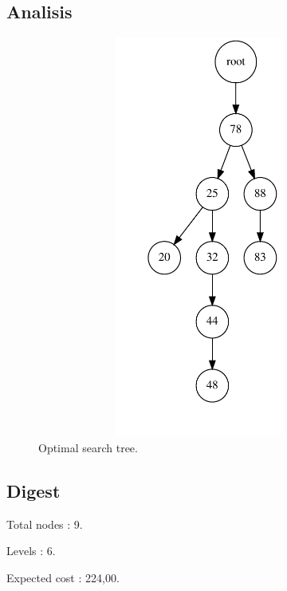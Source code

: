 \documentclass{article}
\begin{document}
\subsection{Analisis}
\begin{figure}[H]\centering
\noindent\includegraphics[height=500px, width=400px, keepaspectratio]{reports/tree.pdf}
\caption{Optimal search tree.}
\end{figure}
\newpage

\subsection{Digest}
\begin{compactitem}
\item Total nodes : {\Large 9}.
\item Levels : {\Large 6}.
\item Expected cost : {\Large 224,00}.
\end{compactitem}
\end{document}
